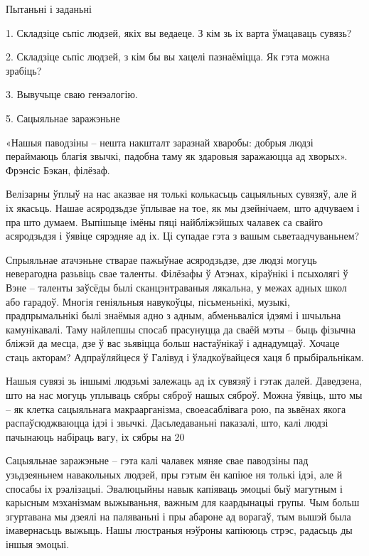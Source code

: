 Пытаньні і заданьні

1. Складзіце сьпіс людзей, якіх вы ведаеце. З кім зь іх варта ўмацаваць сувязь?

2. Складзіце сьпіс людзей, з кім бы вы хацелі пазнаёміцца. Як гэта можна зрабіць?

3. Вывучыце сваю генэалогію.


5. Сацыяльнае заражэньне

«Нашыя паводзіны – нешта накшталт заразнай хваробы: добрыя людзі пераймаюць благія звычкі, падобна таму як здаровыя заражаюцца ад хворых». Фрэнсіс Бэкан, філёзаф. 

Велізарны ўплыў на нас аказвае ня толькі колькасьць сацыяльных сувязяў, але й іх якасьць. Нашае асяродзьдзе ўплывае на тое, як мы дзейнічаем, што адчуваем і пра што думаем. Выпішыце імёны пяці найбліжэйшых чалавек са свайго асяродзьдзя і ўявіце сярэдняе ад іх. Ці супадае гэта з вашым сьветаадчуваньнем?

Спрыяльнае атачэньне стварае пажыўнае асяродзьдзе, дзе людзі могуць неверагодна разьвіць свае таленты. Філёзафы ў Атэнах, кіраўнікі і псыхолягі ў Вэне – таленты заўсёды былі сканцэнтраваныя лякальна, у межах адных школ або гарадоў. Многія геніяльныя навукоўцы, пісьменьнікі, музыкі, прадпрымальнікі былі знаёмыя адно з адным, абменьваліся ідэямі і шчыльна камунікавалі. Таму найлепшы спосаб прасунуцца да сваёй мэты – быць фізычна бліжэй да месца, дзе ў вас зьявіцца больш настаўнікаў і аднадумцаў. Хочаце стаць акторам? Адпраўляйцеся ў Галівуд і ўладкоўвайцеся хаця б прыбіральнікам.

Нашыя сувязі зь іншымі людзьмі залежаць ад іх сувязяў і гэтак далей. Даведзена, што на нас могуць уплываць сябры сяброў нашых сяброў. Можна ўявіць, што мы – як клетка сацыяльнага макраарганізма, своеасаблівага рою, па зьвёнах якога распаўсюджваюцца ідэі і звычкі. Дасьледаваньні паказалі, што, калі людзі пачынаюць набіраць вагу, іх сябры на 20%

Сацыяльнае заражэньне – гэта калі чалавек мяняе свае паводзіны пад узьдзеяньнем навакольных людзей, пры гэтым ён капіюе ня толькі ідэі, але й спосабы іх рэалізацыі. Эвалюцыйны навык капіяваць эмоцыі быў магутным і карысным мэханізмам выжываньня, важным для каардынацыі групы. Чым больш згуртавана мы дзеялі на паляваньні і пры абароне ад ворагаў, тым вышэй была імавернасьць выжыць. Нашы люстраныя нэўроны капіююць стрэс, радасьць ды іншыя эмоцыі.


